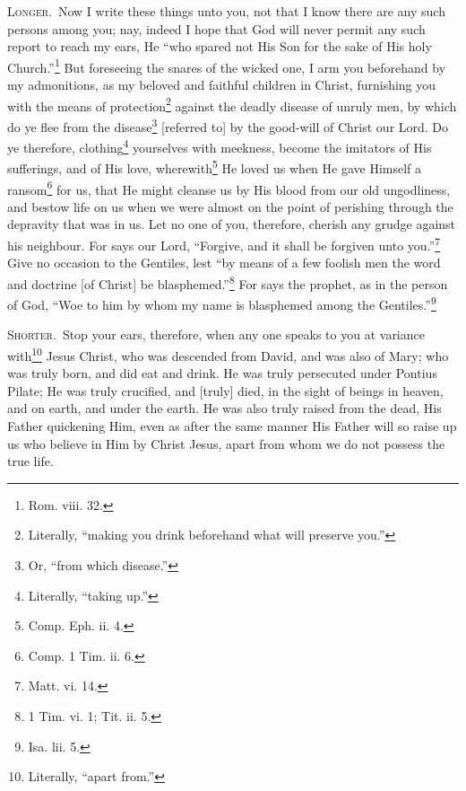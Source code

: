 \textsc{Longer.}~Now I write these things unto you, not that I know there are any such persons among you; nay, indeed I hope that God will never permit any such report to reach my ears, He “who spared not His Son for the sake of His holy Church.”\footnote{Rom. viii. 32.}  But foreseeing the snares of the wicked one, I arm you beforehand by my admonitions, as my beloved and faithful children in Christ, furnishing you with the means of protection\footnote{Literally, “making you drink beforehand what will preserve you.”} against the deadly disease of unruly men, by which do ye flee from the disease\footnote{Or, “from which disease.”} [referred to] by the good-will of Christ our Lord. Do ye therefore, clothing\footnote{Literally, “taking up.”} yourselves with meekness, become the imitators of His sufferings, and of His love, wherewith\footnote{Comp. Eph. ii. 4.} He loved us when He gave Himself a ransom\footnote{Comp. 1 Tim. ii. 6.} for us, that He might cleanse us by His blood from our old ungodliness, and bestow life on us when we were almost on the point of perishing through the depravity that was in us. Let no one of you, therefore, cherish any grudge against his neighbour. For says our Lord, “Forgive, and it shall be forgiven unto you.”\footnote{Matt. vi. 14.} Give no occasion to the Gentiles, lest “by means of a few foolish men the word and doctrine [of Christ] be blasphemed.”\footnote{1 Tim. vi. 1; Tit. ii. 5.} For says the prophet, as in the person of God, “Woe to him by whom my name is blasphemed among the Gentiles.”\footnote{Isa. lii. 5.}


\textsc{Shorter.}~Stop your ears, therefore, when any one speaks to you at variance with\footnote{Literally, “apart from.”}  Jesus Christ, who was descended from David, and was also of Mary; who was truly born, and did eat and drink. He was truly persecuted under Pontius Pilate; He was truly crucified, and [truly] died, in the sight of beings in heaven, and on earth, and under the earth. He was also truly raised from the dead, His Father quickening Him, even as after the same manner His Father will so raise up us who believe in Him by Christ Jesus, apart from whom we do not possess the true life.

